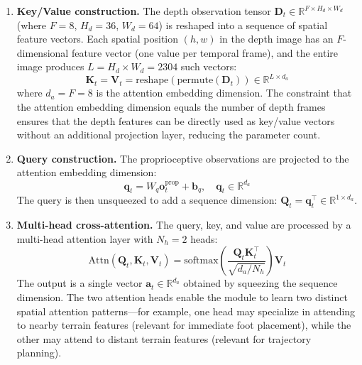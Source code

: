 \begin{enumerate}
    \item \textbf{Key/Value construction.} The depth observation tensor $\mathbf{D}_t \in \mathbb{R}^{F \times H_d \times W_d}$ (where $F=8$, $H_d=36$, $W_d=64$) is reshaped into a sequence of spatial feature vectors. Each spatial position $(h, w)$ in the depth image has an $F$-dimensional feature vector (one value per temporal frame), and the entire image produces $L = H_d \times W_d = 2304$ such vectors:
    \begin{equation}
        \mathbf{K}_t = \mathbf{V}_t = \text{reshape}(\text{permute}(\mathbf{D}_t)) \in \mathbb{R}^{L \times d_a}
    \end{equation}
    where $d_a = F = 8$ is the attention embedding dimension. The constraint that the attention embedding dimension equals the number of depth frames ensures that the depth features can be directly used as key/value vectors without an additional projection layer, reducing the parameter count.

    \item \textbf{Query construction.} The proprioceptive observations are projected to the attention embedding dimension:
    \begin{equation}
        \mathbf{q}_t = W_q \mathbf{o}_t^{\text{prop}} + \mathbf{b}_q, \quad \mathbf{q}_t \in \mathbb{R}^{d_a}
    \end{equation}
    The query is then unsqueezed to add a sequence dimension: $\mathbf{Q}_t = \mathbf{q}_t^{\top} \in \mathbb{R}^{1 \times d_a}$.

    \item \textbf{Multi-head cross-attention.} The query, key, and value are processed by a multi-head attention layer with $N_h = 2$ heads:
    \begin{equation}
        \text{Attn}(\mathbf{Q}_t, \mathbf{K}_t, \mathbf{V}_t) = \text{softmax}\left(\frac{\mathbf{Q}_t \mathbf{K}_t^\top}{\sqrt{d_a / N_h}}\right) \mathbf{V}_t
    \end{equation}
    The output is a single vector $\mathbf{a}_t \in \mathbb{R}^{d_a}$ obtained by squeezing the sequence dimension. The two attention heads enable the module to learn two distinct spatial attention patterns---for example, one head may specialize in attending to nearby terrain features (relevant for immediate foot placement), while the other may attend to distant terrain features (relevant for trajectory planning).
\end{enumerate}

